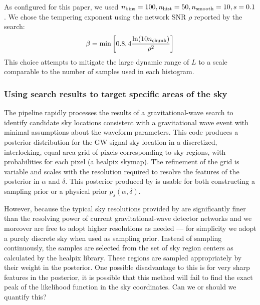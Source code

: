 As configured for this paper, we used $n_{\rm bins}=100, n_{\rm hist}=50,n_{\rm smooth}=10,s=0.1$.  We chose the
tempering exponent using the network SNR $\rho$ reported by the search:
\begin{eqnarray}
\beta = \text{min} \left[ 0.8, 4 \frac{\ln (10 n_{\rm chunk})}{\rho^2} \right]
\end{eqnarray}
This choice attempts to mitigate the large dynamic range of $L$ to a scale comparable to the number of samples used in
each histogram.  










\subsubsection{Using search results to target specific areas of the sky}

The \BS{} pipeline \cite{gw-astro-Bayestar} rapidly processes the results of a gravitational-wave search to identify candidate sky locations consistent with a gravitational wave event with minimal assumptions about the waveform parameters.
%
This code produces a posterior distribution for the GW signal sky location in a discretized, interlocking, equal-area grid of pixels corresponding to sky regions, with probabilities for each pixel (a healpix skymap). The refinement of the grid is variable and scales with the resolution required to resolve the features of the posterior in $\alpha$ and $\delta$. This posterior produced by \BS{} is usable for both constructing a sampling prior or a physical prior $p_s(\alpha,\delta)$.

However, because the typical sky resolutions provided by \BS{} are significantly finer than the resolving power of current gravitational-wave detector networks and we moreover are free to adopt higher resolutions as needed --- for simplicity we adopt a purely discrete sky when used as sampling prior. Instead of sampling continuously, the samples are selected from the set of sky region centers as calculated by the healpix library. These regions are sampled appropriately by their weight in the posterior. One possible disadvantage to this is for very sharp features in the posterior, it is possible that this method will fail to find the exact peak of the likelihood function in the sky coordinates. {\color{blue} Can we or should we quantify this?} 

